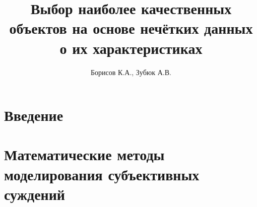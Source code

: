 \documentclass[14pt]{extarticle}
\begin{document}

\thispagestyle{empty}			

\title{Выбор наиболее качественных объектов на основе нечётких данных о их характеристиках} 
\author{Борисов К.А., Зубюк А.В.}
\maketitle

\tableofcontents
\newpage

\section{Введение} 


\section{Математические методы моделирования субъективных суждений}


% 

% 

% 

% 

\printbibliography[heading=bibintoc]
\end{document}
